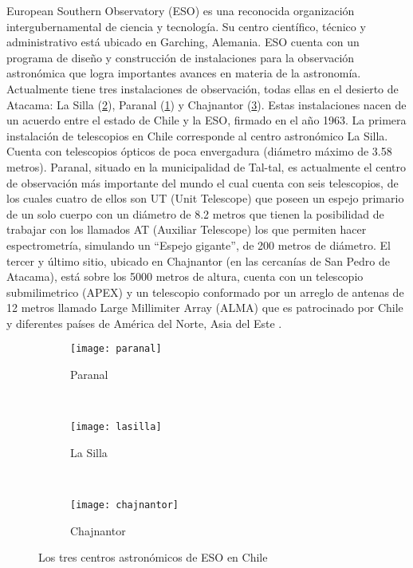 			European Southern Observatory (ESO) es una reconocida organización intergubernamental de ciencia y tecnología. Su centro científico, técnico y administrativo está ubicado en Garching, Alemania. ESO cuenta con un programa de diseño y construcción de instalaciones para la observación astronómica que logra importantes avances en materia de la astronomía. Actualmente tiene tres instalaciones de observación, todas ellas en el desierto de Atacama: La Silla (\ref{fig:lasilla}), Paranal (\ref{fig:paranal}) y Chajnantor (\ref{fig:chajnantor}). Estas instalaciones nacen de un acuerdo entre el estado de Chile y la ESO, firmado en el año 1963. La primera instalación de telescopios en Chile corresponde al centro astronómico La Silla. Cuenta con telescopios ópticos de poca envergadura (diámetro máximo de 3.58 metros). Paranal, situado en la municipalidad de Tal-tal, es actualmente el centro de observación más importante del mundo el cual cuenta con seis telescopios, de los cuales cuatro de ellos son  UT (Unit Telescope) que poseen un espejo primario de un solo cuerpo con un diámetro de 8.2 metros que tienen la posibilidad de trabajar con los llamados AT (Auxiliar Telescope) los que permiten hacer espectrometría, simulando un “Espejo gigante”, de 200 metros de diámetro. El tercer y último sitio, ubicado en Chajnantor (en las cercanías de San Pedro de Atacama), está sobre los 5000 metros de altura, cuenta con un telescopio submilimetrico (APEX) y un telescopio conformado por un arreglo de antenas de 12 metros llamado Large Millimiter Array (ALMA) que es patrocinado por Chile y diferentes países de América del Norte, Asia del Este \cite{esoychile}.		
			\begin{figure}[t]
				\centering
				\begin{subfigure}[b]{0.45\textwidth}
					\texttt{[image: paranal]}
					\caption{Paranal}
					\label{fig:paranal}					
				\end{subfigure} 
				~~
				\begin{subfigure}[b]{0.45\textwidth}					
					\texttt{[image: lasilla]}
					\caption{La Silla}
					\label{fig:lasilla}					
			    \end{subfigure} \\
		    	\vspace{0.5cm}
		        \begin{subfigure}[b]{\textwidth}
					\texttt{[image: chajnantor]}
					\caption{Chajnantor}
					\label{fig:chajnantor}					
				\end{subfigure}	
			\caption{Los tres centros astronómicos de ESO en Chile}	
			\label{observatorios}
			\end{figure}
